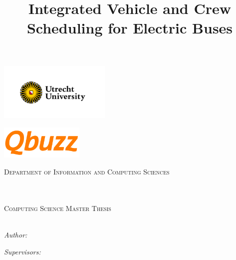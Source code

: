 \documentclass[./main.tex]{subfiles}
\begin{document}
\title{Integrated Vehicle and Crew Scheduling for Electric Buses}

\makeatletter
\begin{titlepage}
    \begin{center}

    \vspace*{.02\textheight}
    {\includegraphics[align=c, width=0.4\textwidth]{uulogo.png}}%
    {\includegraphics[align=c, width=0.3\textwidth]{qbuzzlogo.png}\par}%
    \textsc{\Large Department of Information and Computing Sciences}\\[0.5cm] %

    \HRule \\[0.4cm] %
    {\huge \bfseries \@title \par}\vspace{0.4cm}
    \HRule \\[0.5cm] %

    {\Large \textsc{
        Computing Science Master Thesis \\[0.2cm]
        \large{\@studentnumber}
    }} \\[5.5cm]


    \begin{minipage}[t]{0.4\textwidth}
        \begin{flushleft} \large
            \emph{Author:}\\
            \@author
        \end{flushleft}
    \end{minipage}
    \begin{minipage}[t]{0.4\textwidth}
        \begin{flushright} \large
            \emph{Supervisors:} 


\end{flushright}
\end{minipage}
\end{center}
\end{titlepage}
\end{document}
